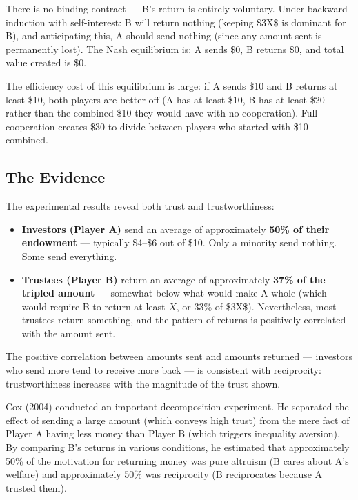 \documentclass[12pt, letterpaper]{article}
\begin{document}
There is no binding contract --- B's return is entirely voluntary. Under backward induction with self-interest: B will return nothing (keeping \$3X\$ is dominant for B), and anticipating this, A should send nothing (since any amount sent is permanently lost). The Nash equilibrium is: A sends \$0, B returns \$0, and total value created is \$0.

The efficiency cost of this equilibrium is large: if A sends \$10 and B returns at least \$10, both players are better off (A has at least \$10, B has at least \$20 rather than the combined \$10 they would have with no cooperation). Full cooperation creates \$30 to divide between players who started with \$10 combined.
\newpage

\subsection{The Evidence}


The experimental results reveal both trust and trustworthiness:

\begin{itemize}
\item \textbf{Investors (Player A)} send an average of approximately \textbf{50\% of their endowment} --- typically \$4--\$6 out of \$10. Only a minority send nothing. Some send everything.
\item \textbf{Trustees (Player B)} return an average of approximately \textbf{37\% of the tripled amount} --- somewhat below what would make A whole (which would require B to return at least $X$, or 33\% of \$3X\$). Nevertheless, most trustees return something, and the pattern of returns is positively correlated with the amount sent.
\end{itemize}

The positive correlation between amounts sent and amounts returned --- investors who send more tend to receive more back --- is consistent with reciprocity: trustworthiness increases with the magnitude of the trust shown.

Cox (2004) conducted an important decomposition experiment. He separated the effect of sending a large amount (which conveys high trust) from the mere fact of Player A having less money than Player B (which triggers inequality aversion). By comparing B's returns in various conditions, he estimated that approximately 50\% of the motivation for returning money was pure altruism (B cares about A's welfare) and approximately 50\% was reciprocity (B reciprocates because A trusted them).
\end{document}
